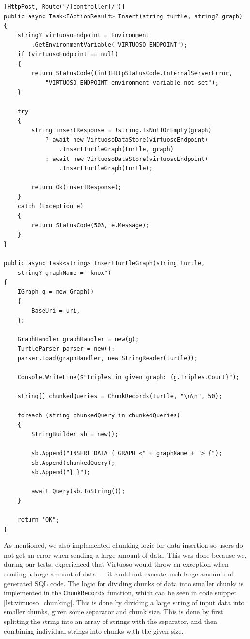 \begin{lstlisting}[language=CSharp, caption={Data insertion endpoint and data insertion logic}, label={lst:virtuoso_data_insertion}]
[HttpPost, Route("/[controller]/")]
public async Task<IActionResult> Insert(string turtle, string? graph)
{
    string? virtuosoEndpoint = Environment
        .GetEnvironmentVariable("VIRTUOSO_ENDPOINT");
    if (virtuosoEndpoint == null)
    {
        return StatusCode((int)HttpStatusCode.InternalServerError, 
            "VIRTUOSO_ENDPOINT environment variable not set");
    }

    try
    {
        string insertResponse = !string.IsNullOrEmpty(graph) 
            ? await new VirtuosoDataStore(virtuosoEndpoint)
                .InsertTurtleGraph(turtle, graph) 
            : await new VirtuosoDataStore(virtuosoEndpoint)
                .InsertTurtleGraph(turtle);

        return Ok(insertResponse);
    }
    catch (Exception e)
    {
        return StatusCode(503, e.Message);
    }
}

public async Task<string> InsertTurtleGraph(string turtle, 
    string? graphName = "knox")
{
    IGraph g = new Graph()
    {
        BaseUri = uri,
    };
    
    GraphHandler graphHandler = new(g);
    TurtleParser parser = new();
    parser.Load(graphHandler, new StringReader(turtle));
    
    Console.WriteLine($"Triples in given graph: {g.Triples.Count}");

    string[] chunkedQueries = ChunkRecords(turtle, "\n\n", 50);

    foreach (string chunkedQuery in chunkedQueries)
    {
        StringBuilder sb = new();
        
        sb.Append("INSERT DATA { GRAPH <" + graphName + "> {");
        sb.Append(chunkedQuery);
        sb.Append("} }");

        await Query(sb.ToString());
    }

    return "OK";
}
\end{lstlisting}


As mentioned, we also implemented chunking logic for data insertion so users do not get an error when sending a large amount of data. 
This was done because we, during our tests, experienced that Virtuoso would throw an exception when sending a large amount of data --- it could not execute such large amounts of generated SQL code. The logic for dividing chunks of data into smaller chunks is implemented in the \texttt{ChunkRecords} function, which can be seen in code snippet \ref{lst:virtuoso_chunking}. This is done by dividing a large string of input data into smaller chunks, given some separator and chunk size. This is done by first splitting the string into an array of strings with the separator, and then combining individual strings into chunks with the given size.

